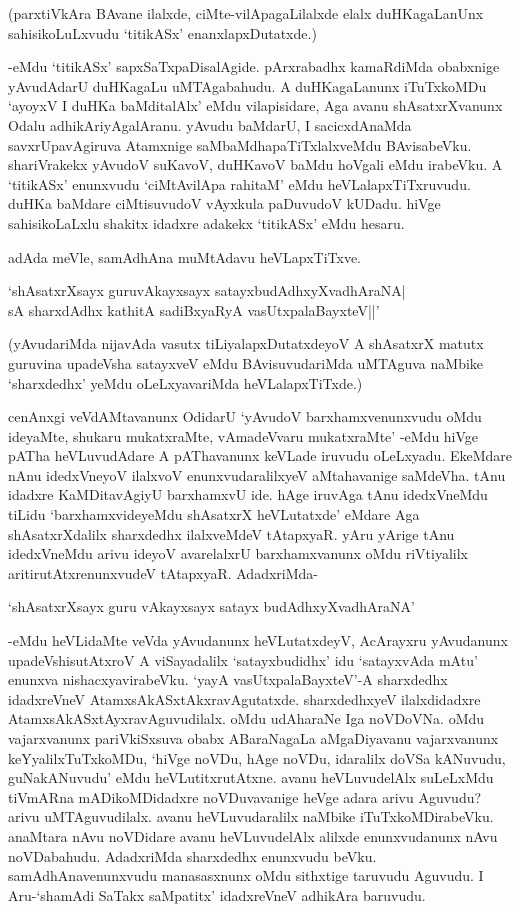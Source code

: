 (parxtiVkAra BAvane ilalxde, ciMte-vilApagaLilalxde elalx duHKagaLanUnx sahisikoLuLxvudu `titikASx' enanxlapxDutatxde.)

-eMdu `titikASx' sapxSaTxpaDisalAgide. pArxrabadhx kamaRdiMda obabxnige yAvudAdarU duHKagaLu uMTAgabahudu. A duHKagaLanunx iTuTxkoMDu `ayoyxV I duHKa baMditalAlx' eMdu vilapisidare, Aga avanu shAsatxrXvanunx Odalu adhikAriyAgalAranu. yAvudu baMdarU, I sacicxdAnaMda savxrUpavAgiruva Atamxnige saMbaMdhapaTiTxlalxveMdu BAvisabeVku. shariVrakekx yAvudoV suKavoV, duHKavoV baMdu hoVgali eMdu irabeVku. A `titikASx' enunxvudu `ciMtAvilApa rahitaM' eMdu heVLalapxTiTxruvudu. duHKa baMdare ciMtisuvudoV vAyxkula paDuvudoV kUDadu. hiVge sahisikoLaLxlu shakitx idadxre adakekx `titikASx' eMdu hesaru.

adAda meVle, samAdhAna muMtAdavu heVLapxTiTxve.

\begin{shloka}
`shAsatxrXsayx guruvAkayxsayx satayxbudAdhxyXvadhAraNA|\\
sA sharxdAdhx kathitA sadiBxyaRyA vasUtxpalaBayxteV||'
\end{shloka}

(yAvudariMda nijavAda vasutx tiLiyalapxDutatxdeyoV A shAsatxrX matutx guruvina upadeVsha satayxveV eMdu BAvisuvudariMda uMTAguva naMbike `sharxdedhx' yeMdu oLeLxyavariMda heVLalapxTiTxde.)

cenAnxgi veVdAMtavanunx OdidarU `yAvudoV barxhamxvenunxvudu oMdu ideyaMte, shukaru mukatxraMte, vAmadeVvaru mukatxraMte' -eMdu hiVge pATha heVLuvudAdare A pAThavanunx keVLade iruvudu oLeLxyadu. EkeMdare nAnu idedxVneyoV ilalxvoV enunxvudaralilxyeV aMtahavanige saMdeVha. tAnu idadxre KaMDitavAgiyU barxhamxvU ide. hAge iruvAga tAnu idedxVneMdu tiLidu `barxhamxvideyeMdu shAsatxrX heVLutatxde' eMdare Aga shAsatxrXdalilx sharxdedhx ilalxveMdeV tAtapxyaR. yAru yArige tAnu idedxVneMdu arivu ideyoV avarelalxrU barxhamxvanunx oMdu riVtiyalilx aritirutAtxrenunxvudeV tAtapxyaR. AdadxriMda-

\begin{shloka}
`shAsatxrXsayx guru vAkayxsayx satayx budAdhxyXvadhAraNA'
\end{shloka}

-eMdu heVLidaMte veVda yAvudanunx heVLutatxdeyV, AcArayxru yAvudanunx upadeVshisutAtxroV A viSayadalilx `satayxbudidhx' idu `satayxvAda mAtu' enunxva nishacxyavirabeVku. `yayA vasUtxpalaBayxteV'-A sharxdedhx idadxreVneV AtamxsAkASxtAkxravAgutatxde. sharxdedhxyeV ilalxdidadxre AtamxsAkASxtAyxravAguvudilalx. oMdu udAharaNe Iga noVDoVNa. oMdu vajarxvanunx pariVkiSxsuva obabx ABaraNagaLa aMgaDiyavanu vajarxvanunx keYyalilxTuTxkoMDu, `hiVge noVDu, hAge noVDu, idaralilx doVSa kANuvudu, guNakANuvudu' eMdu heVLutitxrutAtxne. avanu heVLuvudelAlx suLeLxMdu tiVmARna mADikoMDidadxre noVDuvavanige heVge adara arivu Aguvudu? arivu uMTAguvudilalx. avanu heVLuvudaralilx naMbike iTuTxkoMDirabeVku. anaMtara nAvu noVDidare avanu heVLuvudelAlx alilxde enunxvudanunx nAvu noVDabahudu. AdadxriMda sharxdedhx enunxvudu beVku. samAdhAnavenunxvudu manasasxnunx oMdu sithxtige taruvudu Aguvudu. I Aru-`shamAdi SaTakx saMpatitx' idadxreVneV adhikAra baruvudu.

